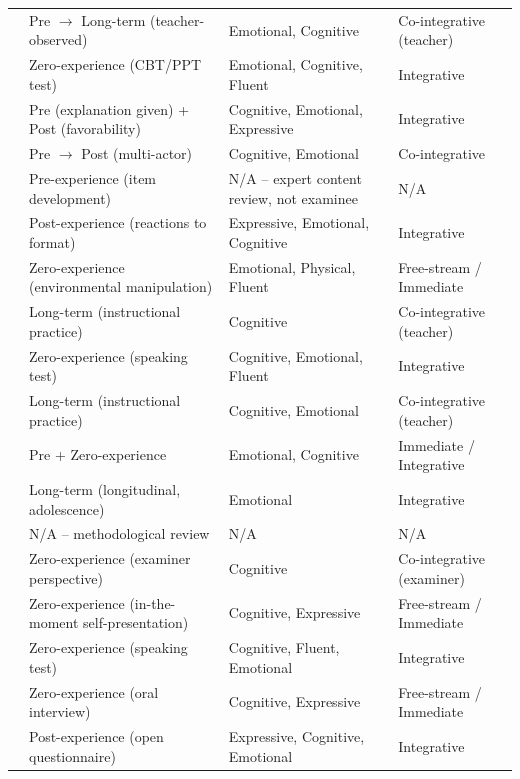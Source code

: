 \documentclass[11pt]{article}
\begin{document}
{\begin{longtable}{p{2.6cm} p{4.3cm} p{4.3cm} p{3.3cm}}
\citet{steuart2024ruralteachers} & Pre $\rightarrow$ Long-term (teacher-observed) & Emotional, Cognitive & Co-integrative (teacher) \\
\citet{eleje2023cbtppt} & Zero-experience (CBT/PPT test) & Emotional, Cognitive, Fluent & Integrative \\
\citet{stierwalt2000explanations} & Pre (explanation given) + Post (favorability) & Cognitive, Emotional, Expressive & Integrative \\
\citet{mccauley2021irish} & Pre $\rightarrow$ Post (multi-actor) & Cognitive, Emotional & Co-integrative \\
\citet{grand2013sensitivity} & Pre-experience (item development) & N/A -- expert content review, not examinee & N/A \\
\citet{zhou2024genderforced} & Post-experience (reactions to format) & Expressive, Emotional, Cognitive & Integrative \\
\citet{amsberry2018sound} & Zero-experience (environmental manipulation) & Emotional, Physical, Fluent & Free-stream / Immediate \\
\citet{weick2024instruction} & Long-term (instructional practice) & Cognitive & Co-integrative (teacher) \\
\citet{dang2024vstep} & Zero-experience (speaking test) & Cognitive, Emotional, Fluent & Integrative \\
\citet{reese2004teachersperceptions} & Long-term (instructional practice) & Cognitive, Emotional & Co-integrative (teacher) \\
\citet{wallace2010motivation} & Pre + Zero-experience & Emotional, Cognitive & Immediate / Integrative \\
\citet{tseng2024taiwanese} & Long-term (longitudinal, adolescence) & Emotional & Integrative \\
\citet{lee2025forcedchoice} & N/A -- methodological review & N/A & N/A \\
\citet{nguyen2026examiners} & Zero-experience (examiner perspective) & Cognitive & Co-integrative (examiner) \\
\citet{kleinbub2026socialdesirability} & Zero-experience (in-the-moment self-presentation) & Cognitive, Expressive & Free-stream / Immediate \\
\citet{nakatsuhara2021videoconferencing} & Zero-experience (speaking test) & Cognitive, Fluent, Emotional & Integrative \\
\citet{quaid2021fluency} & Zero-experience (oral interview) & Cognitive, Expressive & Free-stream / Immediate \\
\citet{amengual2017views} & Post-experience (open questionnaire) & Expressive, Cognitive, Emotional & Integrative \\
\end{longtable}
}
\end{document}
